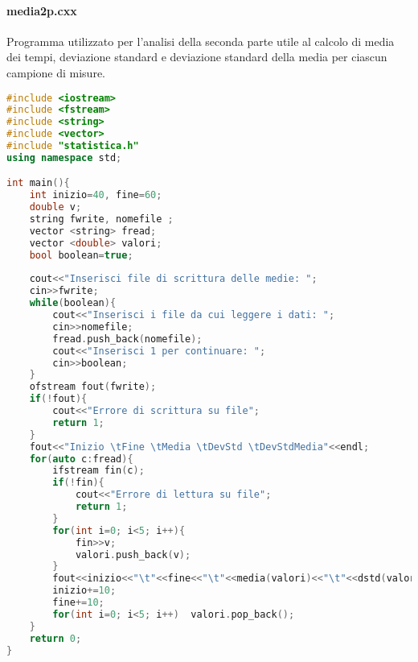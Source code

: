\documentclass[a4paper,11pt,oneside]{article}
\begin{document}
\paragraph{media2p.cxx} Programma utilizzato per l'analisi della seconda parte utile al calcolo di media dei tempi, deviazione standard e deviazione standard della media per ciascun campione di misure. 
\begin{lstlisting}[language=C++, label=lst:media2p.cxx, caption=media2p.cxx]
#include <iostream>
#include <fstream>
#include <string>
#include <vector>
#include "statistica.h"
using namespace std;

int main(){
	int inizio=40, fine=60;
	double v;
	string fwrite, nomefile ;
	vector <string> fread;
	vector <double> valori;
	bool boolean=true;
	
	cout<<"Inserisci file di scrittura delle medie: ";
	cin>>fwrite;
	while(boolean){
		cout<<"Inserisci i file da cui leggere i dati: ";
		cin>>nomefile;
		fread.push_back(nomefile);
		cout<<"Inserisci 1 per continuare: ";
		cin>>boolean;
	}
	ofstream fout(fwrite);
	if(!fout){
		cout<<"Errore di scrittura su file";
		return 1;
	}
	fout<<"Inizio \tFine \tMedia \tDevStd \tDevStdMedia"<<endl;
	for(auto c:fread){
		ifstream fin(c);
		if(!fin){
			cout<<"Errore di lettura su file";
			return 1;
		}
		for(int i=0; i<5; i++){
			fin>>v;
			valori.push_back(v);
		}
		fout<<inizio<<"\t"<<fine<<"\t"<<media(valori)<<"\t"<<dstd(valori)<<"\t"<<dstd_media(valori)<<endl;
		inizio+=10;
		fine+=10;
		for(int i=0; i<5; i++)	valori.pop_back();
	}
	return 0;
}
\end{lstlisting}
\end{document}
